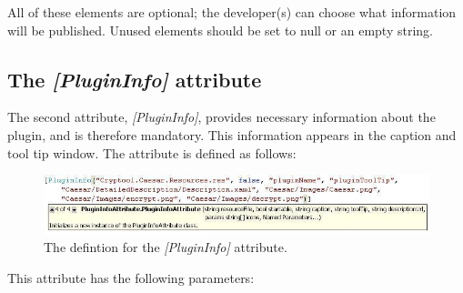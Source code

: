 All of these elements are optional; the developer(s) can choose what information will be published. Unused elements should be set to null or an empty string.
\clearpage


\subsection{The \protect\textit{[PluginInfo]} attribute}
\label{sec:ThePluginInfoAttribute}

The second attribute, \textit{[PluginInfo]}, provides necessary information about the plugin, and is therefore mandatory. This information appears in the caption and tool tip window. The attribute is defined as follows:

\begin{figure}[h]
	\centering
		\includegraphics[width=1.00\textwidth]{figures/attribute_plugininfo_new.jpg}
	\caption{The defintion for the \textit{[PluginInfo]} attribute.}
	\label{fig:attribute_plugininfo}
\end{figure}

\noindent This attribute has the following parameters:

